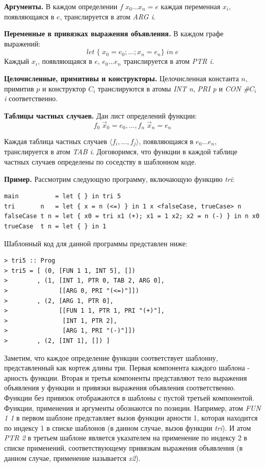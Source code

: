 \documentclass[flenqn, 14pt]{extarticle}
\begin{document}
\textbf{Аргументы.} В каждом определении $f \; x_0 \ldots x_n = e$ каждая переменная $x_i$, появляющаяся в $e$, транслируется в атом \textit{ARG i}.

\textbf{Переменные в привязках выражения объявления.} В каждом графе выражений:
$$
let \; \{ \; x_0 = e_0 ; \ldots ; x_n = e_n \} \; in \; e
$$
Каждый $x_i$, появляющаяся в $e$, $e_0\ldots e_n$ транслируется в атом \textit{PTR i}.

\textbf{Целочисленные, примитивы и конструкторы.} Целочисленная константа $n$, примитив $p$ и конструктор $C_i$ транслируются в атомы \textit{INT n}, \textit{PRI p} и \textit{CON \#$C_i$ i} соответственно.

\textbf{Таблицы частных случаев.} Дан лист определений функции:
$$
f_0 \; \vec{x}_0 = e_0, \ldots, f_n \; \vec{x}_n = e_n
$$

Каждая таблица частных случаев $\langle f_i, \ldots, f_j \rangle$, появляющаяся в $e_0 \ldots e_n$, транслируется в атом \textit{TAB i}. Договоримся, что функции в каждой таблице частных случаев определены по соседству в шаблонном коде.

\textbf{Пример.} Рассмотрим следующую программу, включающую функцию \textit{tri}:
\begin{verbatim}
main          = let { } in tri 5
tri       n   = let { x = n (<=) } in 1 x <falseCase, trueCase> n
falseCase t n = let { x0 = tri x1 (+); x1 = 1 x2; x2 = n (-) } in n x0
trueCase  t n = let { } in 1
\end{verbatim}

Шаблонный код для данной программы представлен ниже:
\begin{verbatim}
> tri5 :: Prog
> tri5 = [ (0, [FUN 1 1, INT 5], [])
>        , (1, [INT 1, PTR 0, TAB 2, ARG 0],
>              [[ARG 0, PRI "(<=)"]])
>        , (2, [ARG 1, PTR 0],
>              [[FUN 1 1, PTR 1, PRI "(+)"],
>               [INT 1, PTR 2],
>               [ARG 1, PRI "(-)"]])
>        , (2, [INT 1], []) ]
\end{verbatim}

Заметим, что каждое определение функции соответствует шаблонну, представленный как кортеж длины три. Первая компонента каждого шаблона - арность функции. Вторая и третья компоненты представляют тело выражения объявления у функции и привязки выражения объявления соответственно. Функции без привязок отображаются в шаблоны с пустой третьей компонентой. Функции, применения и аргументы обознаются по позиции. Например, атом \textit{FUN 1 1} в первом шаблоне представляет вызов функции арности 1, которая находится по индексу 1 в списке шаблонов (в данном случае, вызов функции \textit{tri}). И атом \textit{PTR 2} в третьем шаблоне является указателем на применение по индексу 2 в списке применений, соответствующему привязкам выражения объявления (в данном случае, применение называется \textit{x2}).
\end{document}
